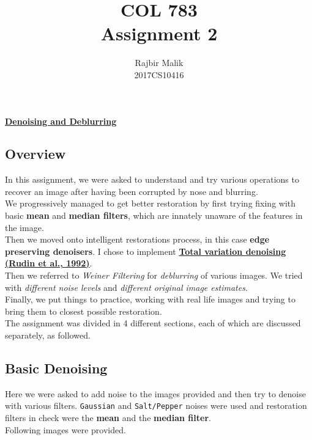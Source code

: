 \documentclass{article}
\title{COL 783 \\ Assignment 2}
\author{Rajbir Malik \\ 2017CS10416}
\begin{document}
    
    \maketitle

    \begin{center}
    \Large{\underline{\textbf{Denoising and Deblurring}}}
    \end{center}
    \subsection*{Overview}
    In this assignment, we were asked to understand and try various operations to recover an image after having been corrupted by nose and blurring.\\ 
    We progressively managed to get better restoration by first trying fixing with basic \textbf{mean} and \textbf{median filters}, which are innately unaware of the features in the image. \\ 
    Then we moved onto intelligent restorations process, in this case \textbf{edge preserving denoisers}. I chose to implement \underline{\textbf{Total variation denoising (Rudin et al., 1992)}}. \\
    Then we referred to \textit{Weiner Filtering} for \textit{deblurring} of various images. We tried with \textit{different noise levels} and \textit{different original image estimates.} \\
    Finally, we put things to practice, working with real life images and trying to bring them to closest possible restoration. \\
    The assignment was divided in 4 different sections, each of which are discussed separately, as followed.
    
    \pagebreak
    \subsection*{Basic Denoising}
    Here we were asked to add noise to the images provided and then try to denoise with various filters. \texttt{Gaussian} and \texttt{Salt/Pepper} noises were used and restoration filters in check were the \textbf{mean} and the \textbf{median filter}.\\
    Following images were provided.
    
\end{document}

